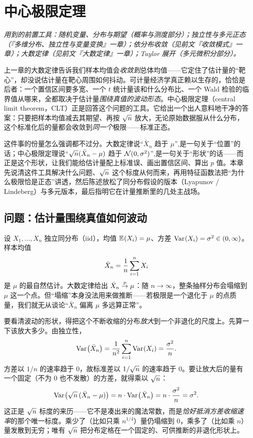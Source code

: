 \chapter{中心极限定理}
\label{ch:clt}

\noindent\emph{用到的前置工具：随机变量、分布与期望（概率与测度部分）；独立性与多元正态（『多维分布、独立性与变量变换』一章）；依分布收敛（见前文『收敛模式』一章）；大数定律（见前文『大数定律』一章）；Taylor 展开（多元微积分部分）。}
\medskip

上一章的大数定律告诉我们样本均值会\emph{收敛到}总体均值——它定住了估计量的``靶心''，却没说估计量在靶心周围如何抖动。可计量经济学真正赖以生存的，恰恰是后者：一个置信区间要多宽、一个 $t$ 统计量该和什么分布比、一个 Wald 检验的临界值从哪来，全都取决于估计量\emph{围绕真值的波动形态}。中心极限定理（central limit theorem，CLT）正是回答这个问题的工具。它给出一个出人意料地干净的答案：只要把样本均值减去其期望、再按 $\sqrt{n}$ 放大，无论原始数据服从什么分布，这个标准化后的量都会收敛到\emph{同一个}极限——标准正态。

这件事的份量怎么强调都不过分。大数定律说``$\bar X_n$ 趋于 $\mu$'',是一句关于``位置''的话；中心极限定理说``$\sqrt{n}(\bar X_n-\mu)$ 趋于 $\mathcal{N}(0,\sigma^2)$'',是一句关于``形状''的话——而正是这个形状，让我们能给估计量配上标准误、画出置信区间、算出 $p$ 值。本章先说清这件工具解决什么问题、$\sqrt{n}$ 这个标度从何而来，再用特征函数法把``为什么极限恰是正态''讲透，然后陈述放松了同分布假设的版本（Lyapunov / Lindeberg）与多元版本，最后指明它在计量推断里的几处主战场。

\section{问题：估计量围绕真值如何波动}
\label{sec:clt-motivation}

设 $X_1,\dots,X_n$ 独立同分布（iid），均值 $\mathbb{E}_{}\!\left(X_i\right)=\mu$、方差 $\operatorname{Var}_{}\!\left(X_i\right)=\sigma^2\in(0,\infty)$。样本均值
\[
    \bar X_n=\frac1n\sum_{i=1}^n X_i
\]
是 $\mu$ 的最自然估计。大数定律给出 $\bar X_n\overset{p}{\to}\mu$：随 $n\to\infty$，整条抽样分布会塌缩到 $\mu$ 这一个点。但``塌缩''本身没法用来做推断——若极限是一个退化于 $\mu$ 的点质量，我们就无从谈论``$\bar X_n$ 偏离 $\mu$ 多远算正常''。

要看清波动的形状，得把这个不断收缩的分布\emph{放大}到一个非退化的尺度上。先算一下该放大多少。由独立性，
\[
    \operatorname{Var}_{}\!\left(\bar X_n\right)=\frac{1}{n^2}\sum_{i=1}^n\operatorname{Var}_{}\!\left(X_i\right)=\frac{\sigma^2}{n}.
\]
方差以 $1/n$ 的速率趋于 $0$，故标准差以 $1/\sqrt{n}$ 的速率趋于 $0$。要让放大后的量有一个固定（不为 $0$ 也不发散）的方差，就得乘以 $\sqrt{n}$：
\[
    \operatorname{Var}_{}\!\left(\sqrt{n}\,(\bar X_n-\mu)\right)
    = n\cdot\operatorname{Var}_{}\!\left(\bar X_n\right)
    = n\cdot\frac{\sigma^2}{n}
    = \sigma^2 .
\]
这正是 $\sqrt{n}$ 标度的来历——它不是凑出来的魔法常数，而是\emph{恰好抵消方差收缩速率}的那个唯一标度。乘少了（比如只乘 $n^{1/4}$）量仍塌缩到 $0$，乘多了（比如乘 $n$）量发散到无穷；唯有 $\sqrt{n}$ 把分布定格在一个固定的、可供推断的非退化形状上。

